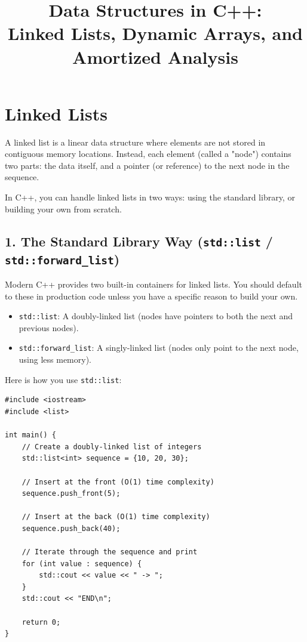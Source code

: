 \documentclass{article}
\title{Data Structures in C++: \\ Linked Lists, Dynamic Arrays, and Amortized Analysis}
\author{}
\date{}
\begin{document}
\maketitle

\section{Linked Lists}
A linked list is a linear data structure where elements are not stored in contiguous memory locations. Instead, each element (called a "node") contains two parts: the data itself, and a pointer (or reference) to the next node in the sequence.

In C++, you can handle linked lists in two ways: using the standard library, or building your own from scratch.

\subsection{1. The Standard Library Way (\texttt{std::list} / \texttt{std::forward\_list})}

Modern C++ provides two built-in containers for linked lists. You should default to these in production code unless you have a specific reason to build your own.

\begin{itemize}
    \item \texttt{std::list}: A doubly-linked list (nodes have pointers to both the next and previous nodes).
    \item \texttt{std::forward\_list}: A singly-linked list (nodes only point to the next node, using less memory).
\end{itemize}

Here is how you use \texttt{std::list}:

\begin{lstlisting}
#include <iostream>
#include <list>

int main() {
    // Create a doubly-linked list of integers
    std::list<int> sequence = {10, 20, 30};

    // Insert at the front (O(1) time complexity)
    sequence.push_front(5);

    // Insert at the back (O(1) time complexity)
    sequence.push_back(40);

    // Iterate through the sequence and print
    for (int value : sequence) {
        std::cout << value << " -> ";
    }
    std::cout << "END\n";

    return 0;
}
\end{lstlisting}
\end{document}
